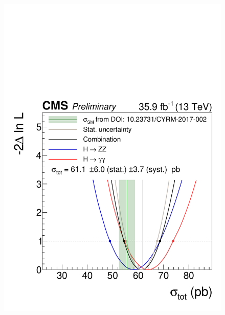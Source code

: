 \begin{figure}[hbtp]
  \begin{center}
    \includegraphics[width=\cmsFigWidth]{img/resultsapproval/reworked/scans_totalXS.pdf}

\end{center}
\end{figure}
